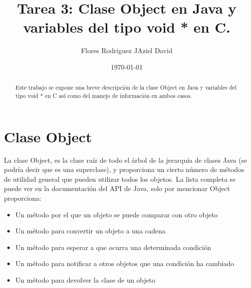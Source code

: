 \documentclass[12pt ]{article}
\author{Flores Rodriguez JAziel David}
\date{\today}
\title{Tarea 3: Clase Object en Java y variables del tipo void * en C.}
\begin{document}
	\maketitle
\begin{abstract}
	Este trabajo se expone una breve descripción de la clase Object en Java y variables del tipo void * en C así como del manejo de información en ambos casos.
\end{abstract}
\section{Clase Object}

La clase Object, es la clase raíz de todo el árbol de la jerarquía de clases Java (se podría decir que es una superclase), y proporciona un cierto número de métodos de utilidad general que pueden utilizar todos los objetos. La lista completa se puede ver en la documentación del API de Java, solo por mencionar Object proporciona:
\begin{itemize}
	\item Un método por el que un objeto se puede comparar con otro objeto
	\item Un método para convertir un objeto a una cadena
	 \item Un método para esperar a que ocurra una determinada condición
	\item Un método para notificar a otros objetos que una condición ha cambiado
	\item Un método para devolver la clase de un objeto
\end{itemize}
\end{document}
